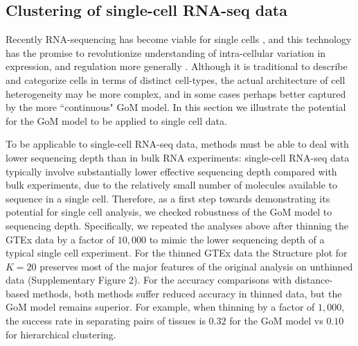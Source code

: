 \subsection{Clustering of single-cell RNA-seq data}

Recently RNA-sequencing has become viable for single cells \cite{Tang2009}, and this technology has the promise to revolutionize understanding of intra-cellular variation in expression, and regulation more generally \cite{Trapnell2015}. Although it is traditional to describe and categorize cells in terms of distinct cell-types, 
the actual architecture of cell heterogeneity may be more complex, and in some cases perhaps better captured by the more ``continuous"  GoM model. 
In this section we illustrate the potential for the GoM model to be applied to single cell data.

To be applicable to single-cell RNA-seq data, methods must be able to deal with lower sequencing depth than in bulk RNA experiments:
 single-cell RNA-seq data typically involve substantially lower effective sequencing depth compared with bulk experiments, due to the relatively small 
 number of molecules available to sequence in a single cell. Therefore, as a first step towards demonstrating its potential for single cell analysis,
  we checked robustness of the GoM model to sequencing depth. Specifically,
we repeated the analyses above after thinning the GTEx data by a factor of $10,000$ to mimic the lower sequencing depth of a typical single cell experiment.
For the thinned GTEx data the Structure plot for $K=20$ preserves most of the major features of the original analysis on unthinned data (Supplementary Figure 2). For the accuracy comparisons with distance-based methods, both methods suffer reduced accuracy in thinned data, but the GoM model remains superior. For example, when thinning by a factor of $1,000$, the success rate in separating pairs of tissues is $0.32$ for the GoM model vs $0.10$ for hierarchical clustering.



